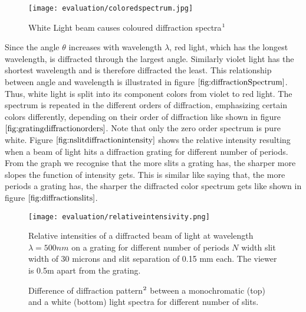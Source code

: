 \begin{figure}[H]
  \centering
  \texttt{[image: evaluation/coloredspectrum.jpg]}
  \caption[Diffracted White Light]{White Light beam causes coloured diffraction spectra$\footnotemark$}
  \label{fig:diffractionSpectrum}
\end{figure}


Since the angle $\theta$ increases with wavelength $\lambda$, red light, which has the longest wavelength, is diffracted through the largest angle. Similarly violet light has the shortest wavelength and is therefore diffracted the least. This relationship between angle and wavelength is illustrated in figure $\ref{fig:diffractionSpectrum}$. Thus, white light is split into its component colors from violet to red light. The spectrum is repeated in the different orders of diffraction, emphasizing certain colors differently, depending on their order of diffraction like shown in figure $\ref{fig:gratingdiffractionorders}$. Note that only the zero order spectrum is pure white.  
Figure $\ref{fig:nslitdiffractionintensity}$ shows the relative intensity resulting when a beam of light hits a diffraction grating for different number of periods. From the graph we recognise that the more slits a grating has, the sharper more slopes the function of intensity gets. This is similar like saying that, the more periods a grating has, the sharper the diffracted color spectrum gets like shown in figure $\ref{fig:diffractionslits}$. 

\begin{figure}[H]
  \centering
  \texttt{[image: evaluation/relativeintensivity.png]}
  \caption[Intensity Plots for Different Number of Slits]{Relative intensities of a diffracted beam of light at wavelength $\lambda=500nm$ on a grating for different number of periods $N$ width slit width of 30 microns and slit separation of 0.15 mm each. The viewer is 0.5m apart from the grating.}
  \label{fig:nslitdiffractionintensity}
\end{figure}

\begin{figure}[H]
  \centering
  
\caption[N Slit Diffraction Grating Pattern]{Difference of diffraction pattern$\footnotemark$ between a monochromatic (top) and a white (bottom) light spectra for different number of slits.}
\label{fig:diffractionslits}
\end{figure}


